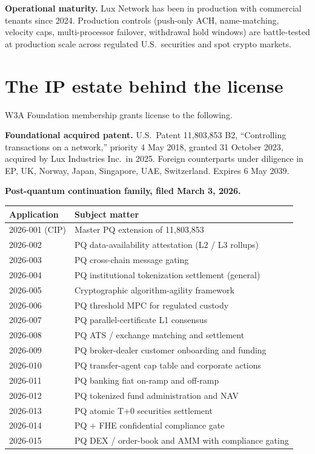\documentclass[11pt,letterpaper]{article}
\begin{document}
\textbf{Operational maturity.} Lux Network has been in production with commercial tenants since 2024. Production controls (push-only ACH, name-matching, velocity caps, multi-processor failover, withdrawal hold windows) are battle-tested at production scale across regulated U.S.\ securities and spot crypto markets.

\section{The IP estate behind the license}

W3A Foundation membership grants license to the following.

\textbf{Foundational acquired patent.} U.S.\ Patent 11,803,853 B2, ``Controlling transactions on a network,'' priority 4 May 2018, granted 31 October 2023, acquired by Lux Industries Inc.\ in 2025. Foreign counterparts under diligence in EP, UK, Norway, Japan, Singapore, UAE, Switzerland. Expires 6 May 2039.

\textbf{Post-quantum continuation family, filed March 3, 2026.}

\begin{longtable}{ll}
\toprule
\textbf{Application} & \textbf{Subject matter} \\
\midrule
2026-001 (CIP) & Master PQ extension of 11,803,853 \\
2026-002 & PQ data-availability attestation (L2 / L3 rollups) \\
2026-003 & PQ cross-chain message gating \\
2026-004 & PQ institutional tokenization settlement (general) \\
2026-005 & Cryptographic algorithm-agility framework \\
2026-006 & PQ threshold MPC for regulated custody \\
2026-007 & PQ parallel-certificate L1 consensus \\
2026-008 & PQ ATS / exchange matching and settlement \\
2026-009 & PQ broker-dealer customer onboarding and funding \\
2026-010 & PQ transfer-agent cap table and corporate actions \\
2026-011 & PQ banking fiat on-ramp and off-ramp \\
2026-012 & PQ tokenized fund administration and NAV \\
2026-013 & PQ atomic T+0 securities settlement \\
2026-014 & PQ + FHE confidential compliance gate \\
2026-015 & PQ DEX / order-book and AMM with compliance gating \\
\bottomrule
\end{longtable}
\end{document}
